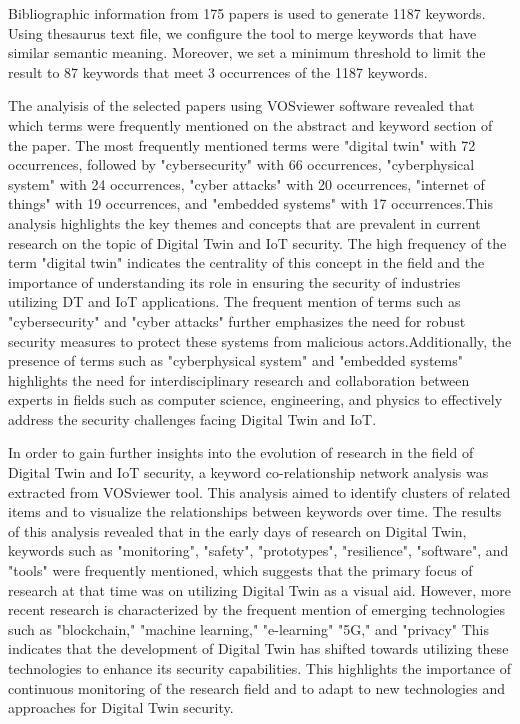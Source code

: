 Bibliographic information from 175 papers is used to generate 1187 keywords. Using thesaurus text file, we configure the tool to merge keywords that have similar semantic meaning. Moreover, we set a minimum threshold to limit the result to 87 keywords that meet 3 occurrences of the 1187 keywords.    


The analyisis of the selected papers using VOSviewer software revealed that which terms were frequently mentioned on the abstract and keyword section of the paper. The most frequently mentioned terms were "digital twin" with 72 occurrences, followed by "cybersecurity" with 66 occurrences, "cyberphysical system" with 24 occurrences, "cyber attacks" with 20 occurrences, "internet of things" with 19 occurrences, and "embedded systems" with 17 occurrences.This analysis highlights the key themes and concepts that are prevalent in current research on the topic of Digital Twin and IoT security. The high frequency of the term "digital twin" indicates the centrality of this concept in the field and the importance of understanding its role in ensuring the security of industries utilizing DT and IoT applications. The frequent mention of terms such as "cybersecurity" and "cyber attacks" further emphasizes the need for robust security measures to protect these systems from malicious actors.Additionally, the presence of terms such as "cyberphysical system" and "embedded systems" highlights the need for interdisciplinary research and collaboration between experts in fields such as computer science, engineering, and physics to effectively address the security challenges facing Digital Twin and IoT.

In order to gain further insights into the evolution of research in the field of Digital Twin and IoT security, a keyword co-relationship network analysis was extracted from VOSviewer tool. This analysis aimed to identify clusters of related items and to visualize the relationships between keywords over time. The results of this analysis revealed that in the early days of research on Digital Twin, keywords such as "monitoring", "safety", "prototypes", "resilience", "software", and "tools" were frequently mentioned, which suggests that the primary focus of research at that time was on utilizing Digital Twin as a visual aid. However, more recent research is characterized by the frequent mention of emerging technologies such as "blockchain," "machine learning," "e-learning" "5G," and "privacy" This indicates that the development of Digital Twin has shifted towards utilizing these technologies to enhance its security capabilities. This highlights the importance of continuous monitoring of the research field and to adapt to new technologies and approaches for Digital Twin security.



